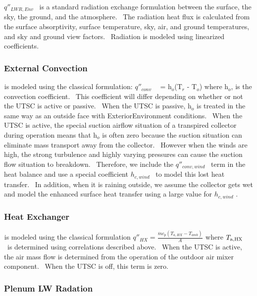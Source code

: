 \({q''_{LWR,Env}}\) ~is a standard radiation exchange formulation between the surface, the sky, the ground, and the atmosphere.~ The radiation heat flux is calculated from the surface absorptivity, surface temperature, sky, air, and ground temperatures, and sky and ground view factors.~ Radiation is modeled using linearized coefficients.

\subsubsection{External Convection}\label{external-convection-000}

\(_{ }\)is modeled using the classical formulation: \({q''_{conv}}\) ~\(_{ }\) = h\(_{o}\)(T\(_{r}\) - T\(_{o}\)) where h\(_{o}\), is the convection coefficient.~ This coefficient will differ depending on whether or not the UTSC is active or passive.~ When the UTSC is passive, h\(_{o}\) is treated in the same way as an outside face with ExteriorEnvironment conditions.~ When the UTSC is active, the special suction airflow situation of a transpired collector during operation means that h\(_{o}\) is often zero because the suction situation can eliminate mass transport away from the collector.~ However when the winds are high, the strong turbulence and highly varying pressures can cause the suction flow situation to breakdown.~ Therefore, we include the \({q''_{conv,wind}}\) ~term in the heat balance and use a special coefficient \({h_{c,wind}}\) ~to model this lost heat transfer.~ In addition, when it is raining outside, we assume the collector gets wet and model the enhanced surface heat transfer using a large value for \({h_{c,wind}}\) .

\subsubsection{Heat Exchanger}\label{heat-exchanger}

\(_{ }\)is modeled using the classical formulation \({q''_{HX}} = \frac{{\dot m{c_p}({T_{a,HX}} - {T_{amb}})}}{A}\) \(_{ }\)where \({T_{{\rm{a,HX}}}}\) ~is determined using correlations described above.~ When the UTSC is active, the air mass flow is determined from the operation of the outdoor air mixer component.~ When the UTSC is off, this term is zero.

\subsubsection{Plenum LW Radation}\label{plenum-lw-radation}

